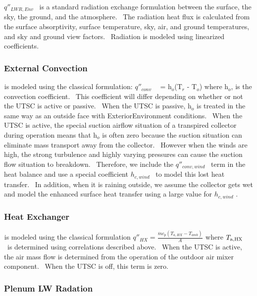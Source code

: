 \({q''_{LWR,Env}}\) ~is a standard radiation exchange formulation between the surface, the sky, the ground, and the atmosphere.~ The radiation heat flux is calculated from the surface absorptivity, surface temperature, sky, air, and ground temperatures, and sky and ground view factors.~ Radiation is modeled using linearized coefficients.

\subsubsection{External Convection}\label{external-convection-000}

\(_{ }\)is modeled using the classical formulation: \({q''_{conv}}\) ~\(_{ }\) = h\(_{o}\)(T\(_{r}\) - T\(_{o}\)) where h\(_{o}\), is the convection coefficient.~ This coefficient will differ depending on whether or not the UTSC is active or passive.~ When the UTSC is passive, h\(_{o}\) is treated in the same way as an outside face with ExteriorEnvironment conditions.~ When the UTSC is active, the special suction airflow situation of a transpired collector during operation means that h\(_{o}\) is often zero because the suction situation can eliminate mass transport away from the collector.~ However when the winds are high, the strong turbulence and highly varying pressures can cause the suction flow situation to breakdown.~ Therefore, we include the \({q''_{conv,wind}}\) ~term in the heat balance and use a special coefficient \({h_{c,wind}}\) ~to model this lost heat transfer.~ In addition, when it is raining outside, we assume the collector gets wet and model the enhanced surface heat transfer using a large value for \({h_{c,wind}}\) .

\subsubsection{Heat Exchanger}\label{heat-exchanger}

\(_{ }\)is modeled using the classical formulation \({q''_{HX}} = \frac{{\dot m{c_p}({T_{a,HX}} - {T_{amb}})}}{A}\) \(_{ }\)where \({T_{{\rm{a,HX}}}}\) ~is determined using correlations described above.~ When the UTSC is active, the air mass flow is determined from the operation of the outdoor air mixer component.~ When the UTSC is off, this term is zero.

\subsubsection{Plenum LW Radation}\label{plenum-lw-radation}

